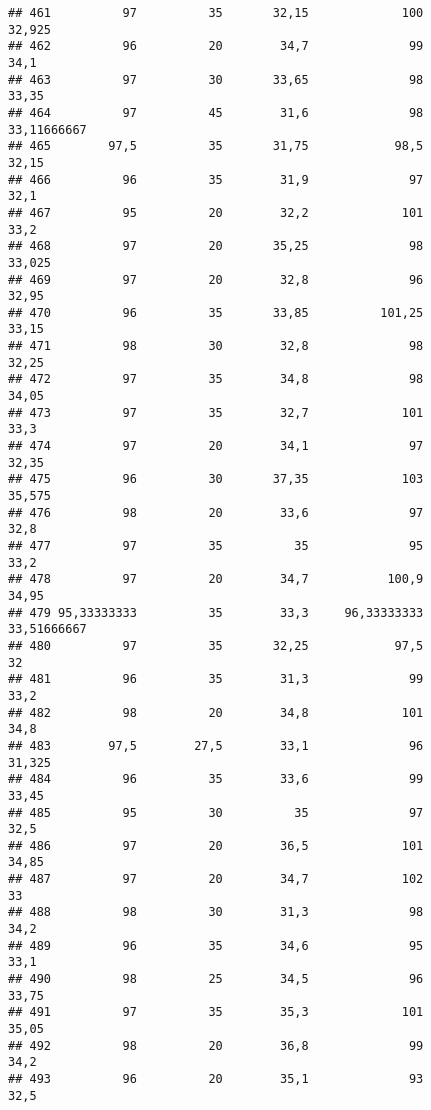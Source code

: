 \documentclass[
]{article}
\begin{document}
\begin{verbatim}
## 461          97          35       32,15             100               32,925
## 462          96          20        34,7              99                 34,1
## 463          97          30       33,65              98                33,35
## 464          97          45        31,6              98          33,11666667
## 465        97,5          35       31,75            98,5                32,15
## 466          96          35        31,9              97                 32,1
## 467          95          20        32,2             101                 33,2
## 468          97          20       35,25              98               33,025
## 469          97          20        32,8              96                32,95
## 470          96          35       33,85          101,25                33,15
## 471          98          30        32,8              98                32,25
## 472          97          35        34,8              98                34,05
## 473          97          35        32,7             101                 33,3
## 474          97          20        34,1              97                32,35
## 475          96          30       37,35             103               35,575
## 476          98          20        33,6              97                 32,8
## 477          97          35          35              95                 33,2
## 478          97          20        34,7           100,9                34,95
## 479 95,33333333          35        33,3     96,33333333          33,51666667
## 480          97          35       32,25            97,5                   32
## 481          96          35        31,3              99                 33,2
## 482          98          20        34,8             101                 34,8
## 483        97,5        27,5        33,1              96               31,325
## 484          96          35        33,6              99                33,45
## 485          95          30          35              97                 32,5
## 486          97          20        36,5             101                34,85
## 487          97          20        34,7             102                   33
## 488          98          30        31,3              98                 34,2
## 489          96          35        34,6              95                 33,1
## 490          98          25        34,5              96                33,75
## 491          97          35        35,3             101                35,05
## 492          98          20        36,8              99                 34,2
## 493          96          20        35,1              93                 32,5

\end{verbatim}
\end{document}
